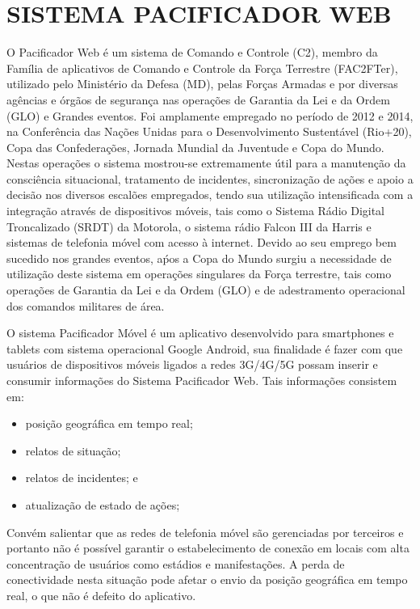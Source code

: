 \chapter{SISTEMA PACIFICADOR WEB}

O Pacificador Web é um sistema de Comando e Controle (C2), membro da Família de aplicativos de Comando e Controle da Força Terrestre (FAC2FTer), utilizado pelo Ministério da Defesa (MD), pelas Forças Armadas e por diversas agências e órgãos de segurança nas operações de Garantia da Lei e da Ordem (GLO) e Grandes eventos. Foi amplamente empregado no período de 2012 e 2014, na Conferência das Nações Unidas para o Desenvolvimento Sustentável (Rio+20), Copa das Confederações, Jornada Mundial da Juventude e Copa do Mundo. Nestas operações o sistema mostrou-se extremamente útil para a manutenção da consciência situacional, tratamento de incidentes, sincronização de ações e apoio a decisão nos diversos escalões empregados, tendo sua utilização intensificada com a integração através de dispositivos móveis, tais como o Sistema Rádio Digital Troncalizado (SRDT) da Motorola, o sistema rádio Falcon III da Harris e sistemas de telefonia móvel com acesso à internet. Devido ao seu emprego bem sucedido nos grandes eventos, aṕos a Copa do Mundo surgiu a necessidade de utilização deste sistema em operações singulares da Força terrestre, tais como operações de Garantia da Lei e da Ordem (GLO) e de adestramento operacional dos comandos militares de área. 

O sistema Pacificador Móvel é um aplicativo desenvolvido para smartphones e tablets com sistema operacional Google Android, sua finalidade é fazer com que usuários de dispositivos móveis ligados a redes 3G/4G/5G possam inserir e consumir informações do Sistema Pacificador Web. Tais informações consistem em:
\begin{itemize}
 \item posição geográfica em tempo real;
 \item relatos de situação;
 \item relatos de incidentes; e
 \item atualização de estado de ações;
\end{itemize}


Convém salientar que as redes de telefonia móvel são gerenciadas por terceiros e portanto não é possível garantir o estabelecimento de conexão em locais com alta concentração de usuários como estádios e manifestações. A perda de conectividade nesta situação pode afetar o envio da posição geográfica em tempo real, o que não é defeito do aplicativo.

